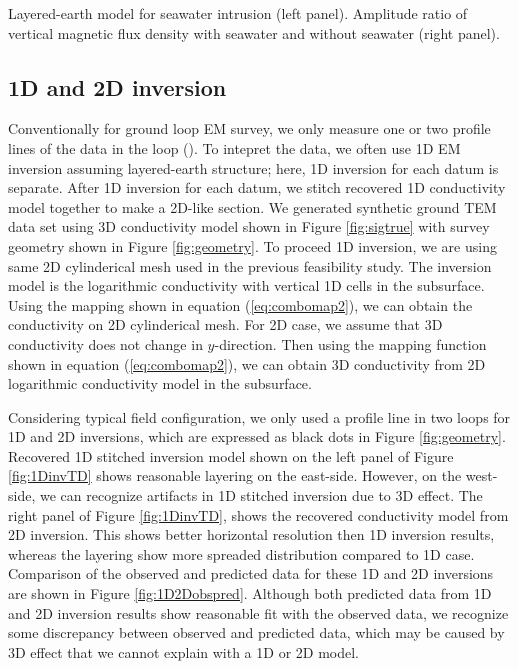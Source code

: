 \documentclass{segabs}
\begin{document}
{Layered-earth model for seawater intrusion (left panel). Amplitude ratio of vertical magnetic flux density with seawater and without seawater (right panel).}

\subsection*{1D and 2D inversion}
Conventionally for ground loop EM survey, we only measure one or two profile lines of the data in the loop (\cite{Mills1988}). To intepret the data, we often use 1D EM inversion assuming layered-earth structure; here, 1D inversion for each datum is separate. After 1D inversion for each datum, we stitch recovered 1D conductivity model together to make a 2D-like section. We generated synthetic ground TEM data set using 3D conductivity model shown in Figure \ref{fig:sigtrue} with survey geometry shown in Figure \ref{fig:geometry}. To proceed 1D inversion, we are using same 2D cylinderical mesh used in the previous feasibility study. The inversion model is the logarithmic conductivity with vertical 1D cells in the subsurface. Using the mapping shown in equation (\ref{eq:combomap2}), we can obtain the conductivity on 2D cylinderical mesh. For 2D case, we assume that 3D conductivity does not change in $y$-direction. Then using the mapping function shown in equation (\ref{eq:combomap2}), we can obtain 3D conductivity from 2D logarithmic conductivity model in the subsurface. 

Considering typical field configuration, we only used a profile line in two loops for 1D and 2D inversions, which are expressed as black dots in Figure \ref{fig:geometry}.
Recovered 1D stitched inversion model shown on the left panel of Figure \ref{fig:1DinvTD} shows reasonable layering on the east-side. However, on the west-side, we can recognize artifacts in 1D stitched inversion due to 3D effect. The right panel of Figure \ref{fig:1DinvTD}, shows the recovered conductivity model from 2D inversion. This shows better horizontal resolution then 1D inversion results, whereas the layering show more spreaded distribution compared to 1D case. Comparison of the observed and predicted data for these 1D and 2D inversions are shown in Figure \ref{fig:1D2Dobspred}. Although both predicted data from 1D and 2D inversion results show reasonable fit with the observed data, we recognize some discrepancy between observed and predicted data, which may be caused by 3D effect that we cannot explain with a 1D or 2D model.
\end{document}
